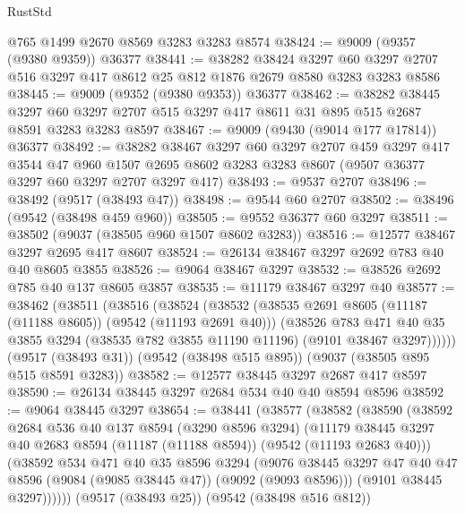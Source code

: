\begin{lexlean}{RustStd}
\begin{coremodule}
    @765
    @1499
    @2670
    @8569
    @3283
    @3283
    @8574
@38424 := @9009 (@9357 (@9380 @9359)) @36377
@38441 := @38282
    @38424
    @3297
    @60
    @3297
    @2707
    @516
    @3297
    @417
    @8612
    @25
    @812
    @1876
    @2679
    @8580
    @3283
    @3283
    @8586
@38445 := @9009 (@9352 (@9380 @9353)) @36377
@38462 := @38282
    @38445
    @3297
    @60
    @3297
    @2707
    @515
    @3297
    @417
    @8611
    @31
    @895
    @515
    @2687
    @8591
    @3283
    @3283
    @8597
@38467 := @9009 (@9430 (@9014 @177 @17814)) @36377
@38492 := @38282
    @38467
    @3297
    @60
    @3297
    @2707
    @459
    @3297
    @417
    @3544
    @47
    @960
    @1507
    @2695
    @8602
    @3283
    @3283
    @8607
    (@9507 @36377 @3297 @60 @3297 @2707 @3297 @417)
@38493 := @9537 @2707
@38496 := @38492 (@9517 (@38493 @47))
@38498 := @9544 @60 @2707
@38502 := @38496 (@9542 (@38498 @459 @960))
@38505 := @9552 @36377 @60 @3297
@38511 := @38502 (@9037 (@38505 @960 @1507 @8602 @3283))
@38516 := @12577 @38467 @3297 @2695 @417 @8607
@38524 := @26134 @38467 @3297 @2692 @783 @40 @40 @8605 @3855
@38526 := @9064 @38467 @3297
@38532 := @38526 @2692 @785 @40 @137 @8605 @3857
@38535 := @11179 @38467 @3297 @40
@38577 := @38462
    (@38511
      (@38516
        (@38524
          (@38532
            (@38535 @2691 @8605 (@11187 (@11188 @8605)) (@9542 (@11193 @2691 @40)))
            (@38526
              @783
              @471
              @40
              @35
              @3855
              @3294
              (@38535 @782 @3855 @11190 @11196)
              (@9101 @38467 @3297))))))
    (@9517 (@38493 @31))
    (@9542 (@38498 @515 @895))
    (@9037 (@38505 @895 @515 @8591 @3283))
@38582 := @12577 @38445 @3297 @2687 @417 @8597
@38590 := @26134 @38445 @3297 @2684 @534 @40 @40 @8594 @8596
@38592 := @9064 @38445 @3297
@38654 := @38441
    (@38577
      (@38582
        (@38590
          (@38592
            @2684
            @536
            @40
            @137
            @8594
            (@3290 @8596 @3294)
            (@11179 @38445 @3297 @40 @2683 @8594 (@11187 (@11188 @8594)) (@9542 (@11193 @2683 @40)))
            (@38592
              @534
              @471
              @40
              @35
              @8596
              @3294
              (@9076
                @38445
                @3297
                @47
                @40
                @47
                @8596
                (@9084 (@9085 @38445 @47))
                (@9092 (@9093 @8596)))
              (@9101 @38445 @3297))))))
    (@9517 (@38493 @25))
    (@9542 (@38498 @516 @812))

\end{coremodule}
\end{lexlean}
